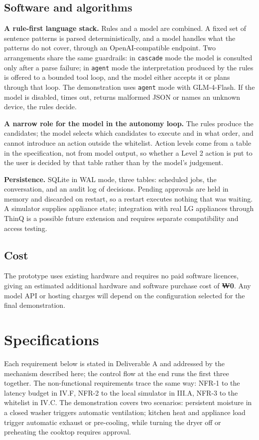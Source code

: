 \documentclass[conference]{IEEEtran}
\begin{document}
\subsection{Software and algorithms}

\textbf{A rule-first language stack.} Rules and a model are combined. A fixed set of sentence patterns is parsed deterministically, and a model handles what the patterns do not cover, through an OpenAI-compatible endpoint. Two arrangements share the same guardrails: in \texttt{cascade} mode the model is consulted only after a parse failure; in \texttt{agent} mode the interpretation produced by the rules is offered to a bounded tool loop, and the model either accepts it or plans through that loop. The demonstration uses \texttt{agent} mode with GLM-4-Flash. If the model is disabled, times out, returns malformed JSON or names an unknown device, the rules decide.

\textbf{A narrow role for the model in the autonomy loop.} The rules produce the candidates; the model selects which candidates to execute and in what order, and cannot introduce an action outside the whitelist. Action levels come from a table in the specification, not from model output, so whether a Level 2 action is put to the user is decided by that table rather than by the model's judgement.

\textbf{Persistence.} SQLite in WAL mode, three tables: scheduled jobs, the conversation, and an audit log of decisions. Pending approvals are held in memory and discarded on restart, so a restart executes nothing that was waiting. A simulator supplies appliance state; integration with real LG appliances through ThinQ is a possible future extension and requires separate compatibility and access testing.

\subsection{Cost}

The prototype uses existing hardware and requires no paid software licences, giving an estimated additional hardware and software purchase cost of \textbf{₩0}. Any model API or hosting charges will depend on the configuration selected for the final demonstration.

\section{Specifications}

Each requirement below is stated in Deliverable A and addressed by the mechanism described here; the control flow at the end runs the first three together. The non-functional requirements trace the same way: NFR-1 to the latency budget in IV.F, NFR-2 to the local simulator in III.A, NFR-3 to the whitelist in IV.C. The demonstration covers two scenarios: persistent moisture in a closed washer triggers automatic ventilation; kitchen heat and appliance load trigger automatic exhaust or pre-cooling, while turning the dryer off or preheating the cooktop requires approval.
\end{document}
